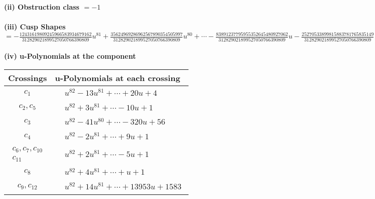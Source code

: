 \documentclass[1p]{elsarticle_modified}
\theoremstyle{definition}
\begin{document}
\flushleft \textbf{(ii) Obstruction class $= -1$}\\~\\
\flushleft \textbf{(iii) Cusp Shapes $= -\frac{12431619809245966583934679162}{312829021899527050766390809} u^{81}+\frac{35624969286962567890354505997}{312829021899527050766390809} u^{80}+\cdots-\frac{83891237795955352645480927062}{312829021899527050766390809} u-\frac{25270533899815883781765835149}{312829021899527050766390809}$}\\~\\
\newpage\renewcommand{\arraystretch}{1}
\flushleft \textbf{(iv) u-Polynomials at the component}\newline \\
\begin{tabular}{m{50pt}|m{274pt}}
Crossings & \hspace{64pt}u-Polynomials at each crossing \\
\hline $$\begin{aligned}c_{1}\end{aligned}$$&$\begin{aligned}
&u^{82}-13 u^{81}+\cdots+20 u+4
\end{aligned}$\\
\hline $$\begin{aligned}c_{2},c_{5}\end{aligned}$$&$\begin{aligned}
&u^{82}+3 u^{81}+\cdots-10 u+1
\end{aligned}$\\
\hline $$\begin{aligned}c_{3}\end{aligned}$$&$\begin{aligned}
&u^{82}-41 u^{80}+\cdots-320 u+56
\end{aligned}$\\
\hline $$\begin{aligned}c_{4}\end{aligned}$$&$\begin{aligned}
&u^{82}-2 u^{81}+\cdots+9 u+1
\end{aligned}$\\
\hline $$\begin{aligned}c_{6},c_{7},c_{10}\\c_{11}\end{aligned}$$&$\begin{aligned}
&u^{82}+2 u^{81}+\cdots-5 u+1
\end{aligned}$\\
\hline $$\begin{aligned}c_{8}\end{aligned}$$&$\begin{aligned}
&u^{82}+4 u^{81}+\cdots+u+1
\end{aligned}$\\
\hline $$\begin{aligned}c_{9},c_{12}\end{aligned}$$&$\begin{aligned}
&u^{82}+14 u^{81}+\cdots+13953 u+1583
\end{aligned}$\\
\hline
\end{tabular}\\~\\
\end{document}
